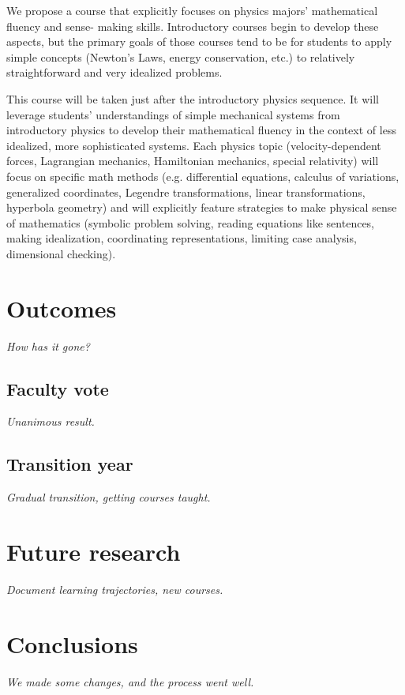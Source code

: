 \documentclass[english,aps,pra,reprint,noshowpacs,superscriptaddress]{revtex4-1}
\begin{document}
We propose a course that explicitly focuses on physics majors'
mathematical fluency and sense- making skills. Introductory courses
begin to develop these aspects, but the primary goals of those courses
tend to be for students to apply simple concepts (Newton's Laws,
energy conservation, etc.)  to relatively straightforward and very
idealized problems.

This course will be taken just after the introductory physics
sequence. It will leverage students' understandings of simple
mechanical systems from introductory physics to develop their
mathematical fluency in the context of less idealized, more
sophisticated systems. Each physics topic (velocity-dependent forces,
Lagrangian mechanics, Hamiltonian mechanics, special relativity) will
focus on specific math methods (e.g. differential equations, calculus
of variations, generalized coordinates, Legendre transformations,
linear transformations, hyperbola geometry) and will explicitly
feature strategies to make physical sense of mathematics (symbolic
problem solving, reading equations like sentences, making
idealization, coordinating representations, limiting case analysis,
dimensional checking).

\section{Outcomes}
\emph{How has it gone?}

\subsection{Faculty vote}
\emph{Unanimous result.}
\subsection{Transition year}
\emph{Gradual transition, getting courses taught.}

\section{Future research}
\emph{Document learning trajectories, new courses.}



\section{Conclusions}
\emph{We made some changes, and the process went well.}
\end{document}
